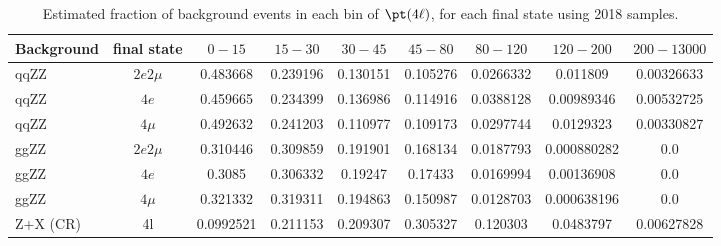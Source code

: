 \begin{table}[!h!tb]
\begin{center}
\scriptsize
    \caption{
        Estimated fraction of background events in each bin of $\pt(4\ell)$, for each final state using 2018 samples.
\label{tab:fractions_pT4l}
}
\begin{tabular}{|l|c|c|c|c|c|c|c|c|}
\hline
Background & final state & $0-15$ & $15-30$ & $30-45$ & $45-80$ & $80-120$ & $120-200$ & $200-13000$ \\ \hline
qqZZ& $2e2\mu$  & 0.483668  & 0.239196  & 0.130151  & 0.105276 & 0.0266332  & 0.011809  & 0.00326633 \\
qqZZ& $4e$  & 0.459665  & 0.234399  & 0.136986  & 0.114916 & 0.0388128  & 0.00989346  & 0.00532725 \\
qqZZ& $4\mu$  & 0.492632  & 0.241203  & 0.110977  & 0.109173 & 0.0297744  & 0.0129323  & 0.00330827 \\
\hline
ggZZ& $2e2\mu$  &  0.310446 & 0.309859  & 0.191901  & 0.168134 & 0.0187793  & 0.000880282  & 0.0 \\
ggZZ& $4e$  & 0.3085  & 0.306332  & 0.19247  & 0.17433 & 0.0169994  & 0.00136908  & 0.0 \\
ggZZ& $4\mu$  & 0.321332  & 0.319311  & 0.194863  & 0.150987 & 0.0128703  & 0.000638196  & 0.0 \\
\hline
Z+X (CR)& 4l  & 0.0992521  & 0.211153  & 0.209307 & 0.305327  & 0.120303  & 0.0483797 & 0.00627828 \\
\hline
\end{tabular}
\normalsize
\end{center}
\end{table}
%
